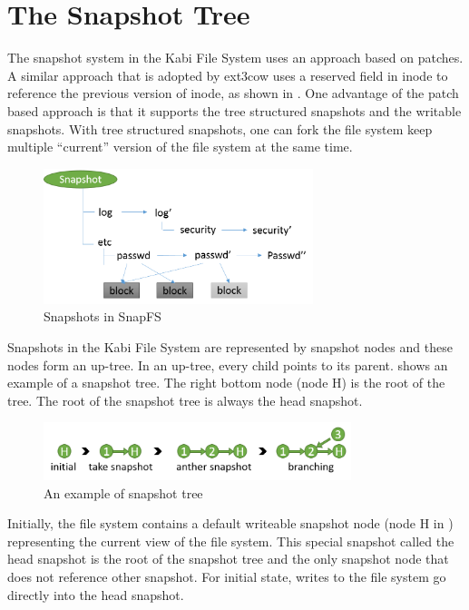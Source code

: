 \section{The Snapshot Tree}

    The snapshot system in the Kabi File System uses an approach based on patches. A similar approach that is adopted by ext3cow uses a reserved field in inode to reference the previous version of inode, as shown in . One advantage of the patch based approach is that it supports the tree structured snapshots and the writable snapshots. With tree structured snapshots, one can fork the file system keep multiple ``current'' version of the file system at the same time.

\begin{figure}[t]
\centering
\includegraphics[width=0.7\textwidth]{Chapter-4/figs/fig24.png}
\caption{Snapshots in SnapFS}
\label{fig:snapfs_approach}
\end{figure}

    Snapshots in the Kabi File System are represented by snapshot nodes and these nodes form an up-tree. In an up-tree, every child points to its parent.  shows an example of a snapshot tree. The right bottom node (node H) is the root of the tree. The root of the snapshot tree is always the head snapshot.

\begin{figure}[t]
\centering
\includegraphics[width=0.8\textwidth]{Chapter-4/figs/fig13.png}
\caption{An example of snapshot tree}
\label{fig:snap_tree_example}
\end{figure}

    Initially, the file system contains a default writeable snapshot node (node H in ) representing the current view of the file system. This special snapshot called the head snapshot is the root of the snapshot tree and the only snapshot node that does not reference other snapshot. For initial state,  writes to the file system go directly into the head snapshot.
    
